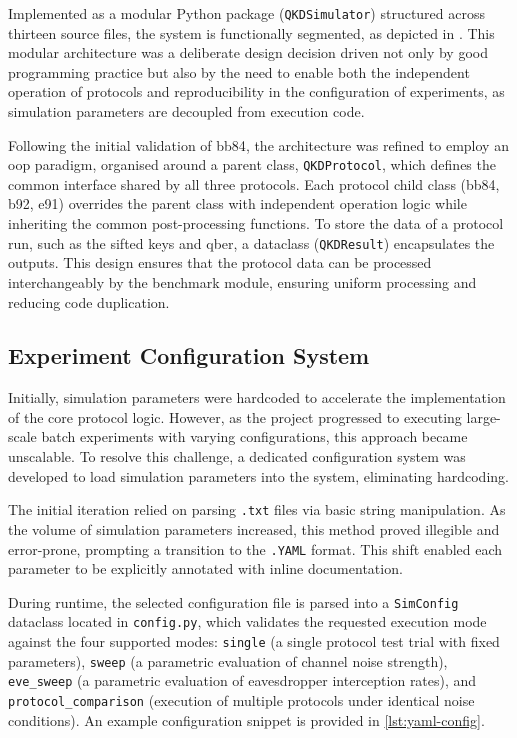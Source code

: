 Implemented as a modular Python package (\texttt{QKDSimulator}) structured across thirteen source files, the system is functionally segmented, as depicted in . This modular architecture was a deliberate design decision driven not only by good programming practice but also by the need to enable both the independent operation of protocols and reproducibility in the configuration of experiments, as simulation parameters are decoupled from execution code.  

Following the initial validation of \gls{bb84}, the architecture was refined to employ an \gls{oop} paradigm, organised around a parent class, \texttt{QKDProtocol}, which defines the common interface shared by all three protocols. Each protocol child class (\gls{bb84}, \gls{b92}, \gls{e91}) overrides the parent class with independent operation logic while inheriting the common post-processing functions. To store the data of a protocol run, such as the sifted keys and \gls{qber}, a dataclass (\texttt{QKDResult}) encapsulates the outputs. This design ensures that the protocol data can be processed interchangeably by the benchmark module, ensuring uniform processing and reducing code duplication. 

\subsection{Experiment Configuration System}
\label{subsec:config}

Initially, simulation parameters were hardcoded to accelerate the implementation of the core protocol logic. However, as the project progressed to executing large-scale batch experiments with varying configurations, this approach became unscalable. To resolve this challenge, a dedicated configuration system was developed to load simulation parameters into the system, eliminating hardcoding. 

The initial iteration relied on parsing \texttt{.txt} files via basic string manipulation. As the volume of simulation parameters increased, this method proved illegible and error-prone, prompting a transition to the \texttt{.YAML} format. This shift enabled each parameter to be explicitly annotated with inline documentation.

During runtime, the selected configuration file is parsed into a \texttt{SimConfig} dataclass located in \texttt{config.py}, which validates the requested execution mode against the four supported modes: \texttt{single} (a single protocol test trial with fixed parameters), \texttt{sweep} (a parametric evaluation of channel noise strength), \texttt{eve\_sweep} (a parametric evaluation of eavesdropper interception rates), and \texttt{protocol\_comparison} (execution of multiple protocols under identical noise conditions). An example configuration snippet is provided in \cref{lst:yaml-config}.

